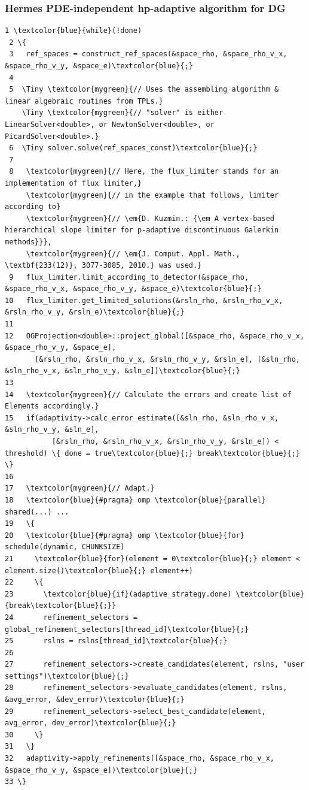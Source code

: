 \documentclass{beamer}
\begin{document}
\begin{frame}[fragile]
\frametitle{Hermes PDE-independent hp-adaptive algorithm for DG}
\begin{Verbatim}[commandchars=\\\{\}, fontsize=\Tinyc]
 1 \textcolor{blue}{while}(!done)
 2 \{
 3   ref_spaces = construct_ref_spaces(&space_rho, &space_rho_v_x, &space_rho_v_y, &space_e)\textcolor{blue}{;}
 4
 5  \Tiny \textcolor{mygreen}{// Uses the assembling algorithm & linear algebraic routines from TPLs.}
    \Tiny \textcolor{mygreen}{// "solver" is either LinearSolver<double>, or NewtonSolver<double>, or PicardSolver<double>.}
 6  \Tiny solver.solve(ref_spaces_const)\textcolor{blue}{;}
 7   
 8   \textcolor{mygreen}{// Here, the flux_limiter stands for an implementation of flux limiter,}
     \textcolor{mygreen}{// in the example that follows, limiter according to}
     \textcolor{mygreen}{// \em{D. Kuzmin.: {\em A vertex-based hierarchical slope limiter for p-adaptive discontinuous Galerkin methods}}}, 
     \textcolor{mygreen}{// \em{J. Comput. Appl. Math., \textbf{233(12)}, 3077-3085, 2010.} was used.}
 9   flux_limiter.limit_according_to_detector(&space_rho, &space_rho_v_x, &space_rho_v_y, &space_e)\textcolor{blue}{;}
10   flux_limiter.get_limited_solutions(&rsln_rho, &rsln_rho_v_x, &rsln_rho_v_y, &rsln_e)\textcolor{blue}{;}
11
12   OGProjection<double>::project_global([&space_rho, &space_rho_v_x, &space_rho_v_y, &space_e],
       [&rsln_rho, &rsln_rho_v_x, &rsln_rho_v_y, &rsln_e], [&sln_rho, &sln_rho_v_x, &sln_rho_v_y, &sln_e])\textcolor{blue}{;}
13
14   \textcolor{mygreen}{// Calculate the errors and create list of Elements accordingly.}
15   if(adaptivity->calc_error_estimate([&sln_rho, &sln_rho_v_x, &sln_rho_v_y, &sln_e],
           [&rsln_rho, &rsln_rho_v_x, &rsln_rho_v_y, &rsln_e]) < threshold) \{ done = true\textcolor{blue}{;} break\textcolor{blue}{;} \}
16 
17   \textcolor{mygreen}{// Adapt.}
18   \textcolor{blue}{#pragma} omp \textcolor{blue}{parallel} shared(...) ...
19   \{
20   \textcolor{blue}{#pragma} omp \textcolor{blue}{for} schedule(dynamic, CHUNKSIZE)
21     \textcolor{blue}{for}(element = 0\textcolor{blue}{;} element < element.size()\textcolor{blue}{;} element++)
22     \{
23       \textcolor{blue}{if}(adaptive_strategy.done) \textcolor{blue}{break\textcolor{blue}{;}}
24       refinement_selectors = global_refinement_selectors[thread_id]\textcolor{blue}{;}
25       rslns = rslns[thread_id]\textcolor{blue}{;}
26       
27       refinement_selectors->create_candidates(element, rslns, "user settings")\textcolor{blue}{;}
28       refinement_selectors->evaluate_candidates(element, rslns, &avg_error, &dev_error)\textcolor{blue}{;}
29       refinement_selectors->select_best_candidate(element, avg_error, dev_error)\textcolor{blue}{;}
30     \}
31   \}
32   adaptivity->apply_refinements([&space_rho, &space_rho_v_x, &space_rho_v_y, &space_e])\textcolor{blue}{;}
33 \}
\end{Verbatim}
\end{frame}
\end{document}
